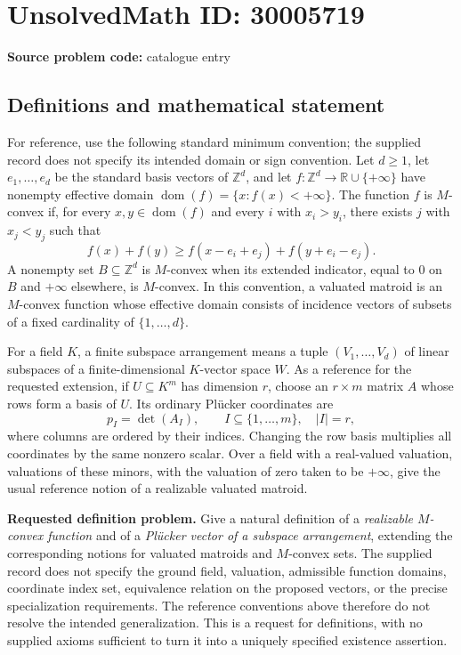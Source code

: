 \documentclass[11pt]{article}
\newcommand{\Z}{\mathbb{Z}}
\newcommand{\R}{\mathbb{R}}
\begin{document}
\section*{UnsolvedMath ID: 30005719}
\textbf{Source problem code:} catalogue entry
\subsection{Definitions and mathematical statement}
For reference, use the following standard minimum convention; the supplied record does not specify its intended domain or sign convention. Let \(d\geq 1\), let \(e_1,\ldots,e_d\) be the standard basis vectors of \(\Z^d\), and let \(f:\Z^d\to\R\cup\{+\infty\}\) have nonempty effective domain \(\operatorname{dom}(f)=\{x:f(x)<+\infty\}\). The function \(f\) is \(M\)-convex if, for every \(x,y\in\operatorname{dom}(f)\) and every \(i\) with \(x_i>y_i\), there exists \(j\) with \(x_j<y_j\) such that
\[
f(x)+f(y)\geq f(x-e_i+e_j)+f(y+e_i-e_j).
\]
A nonempty set \(B\subseteq\Z^d\) is \(M\)-convex when its extended indicator, equal to \(0\) on \(B\) and \(+\infty\) elsewhere, is \(M\)-convex. In this convention, a valuated matroid is an \(M\)-convex function whose effective domain consists of incidence vectors of subsets of a fixed cardinality of \(\{1,\ldots,d\}\).

For a field \(K\), a finite subspace arrangement means a tuple \((V_1,\ldots,V_d)\) of linear subspaces of a finite-dimensional \(K\)-vector space \(W\). As a reference for the requested extension, if \(U\subseteq K^m\) has dimension \(r\), choose an \(r\times m\) matrix \(A\) whose rows form a basis of \(U\). Its ordinary Pl\"ucker coordinates are
\[
p_I=\det(A_I),\qquad I\subseteq\{1,\ldots,m\},\quad |I|=r,
\]
where columns are ordered by their indices. Changing the row basis multiplies all coordinates by the same nonzero scalar. Over a field with a real-valued valuation, valuations of these minors, with the valuation of zero taken to be \(+\infty\), give the usual reference notion of a realizable valuated matroid.

\textbf{Requested definition problem.} Give a natural definition of a \emph{realizable \(M\)-convex function} and of a \emph{Pl\"ucker vector of a subspace arrangement}, extending the corresponding notions for valuated matroids and \(M\)-convex sets. The supplied record does not specify the ground field, valuation, admissible function domains, coordinate index set, equivalence relation on the proposed vectors, or the precise specialization requirements. The reference conventions above therefore do not resolve the intended generalization. This is a request for definitions, with no supplied axioms sufficient to turn it into a uniquely specified existence assertion.
\end{document}
